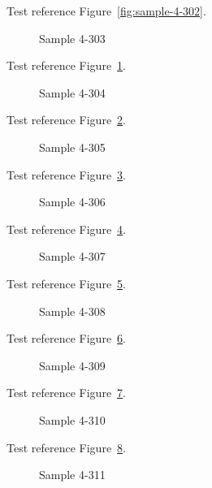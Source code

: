 Test reference Figure~\ref{fig:sample-4-302}.

\begin{figure}[tbhp]
\caption{Sample 4-303}
\label{fig:sample-4-303}
\end{figure}

Test reference Figure~\ref{fig:sample-4-303}.

\begin{figure}[tbhp]
\caption{Sample 4-304}
\label{fig:sample-4-304}
\end{figure}

Test reference Figure~\ref{fig:sample-4-304}.

\begin{figure}[tbhp]
\caption{Sample 4-305}
\label{fig:sample-4-305}
\end{figure}

Test reference Figure~\ref{fig:sample-4-305}.

\begin{figure}[tbhp]
\caption{Sample 4-306}
\label{fig:sample-4-306}
\end{figure}

Test reference Figure~\ref{fig:sample-4-306}.

\begin{figure}[tbhp]
\caption{Sample 4-307}
\label{fig:sample-4-307}
\end{figure}

Test reference Figure~\ref{fig:sample-4-307}.

\begin{figure}[tbhp]
\caption{Sample 4-308}
\label{fig:sample-4-308}
\end{figure}

Test reference Figure~\ref{fig:sample-4-308}.

\begin{figure}[tbhp]
\caption{Sample 4-309}
\label{fig:sample-4-309}
\end{figure}

Test reference Figure~\ref{fig:sample-4-309}.

\begin{figure}[tbhp]
\caption{Sample 4-310}
\label{fig:sample-4-310}
\end{figure}

Test reference Figure~\ref{fig:sample-4-310}.

\begin{figure}[tbhp]
\caption{Sample 4-311}
\label{fig:sample-4-311}
\end{figure}

